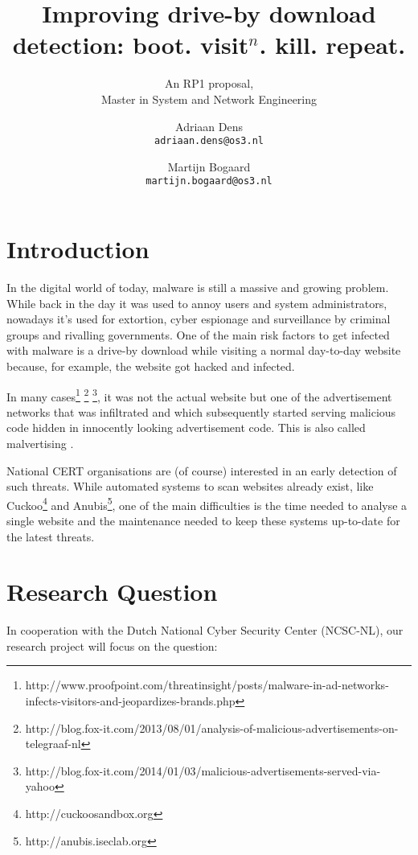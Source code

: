 \documentclass{scrartcl}
\title{Improving drive-by download detection: boot. visit$^n$. kill. repeat.}
\subtitle{An RP1 proposal,\\Master in System and Network Engineering}
\author{
  Adriaan Dens\\
   \texttt{adriaan.dens@os3.nl}
  \and
  Martijn Bogaard\\
   \texttt{martijn.bogaard@os3.nl}
}
\begin{document}
\maketitle

\section{Introduction}

In the digital world of today, malware is still a massive and growing problem. While back in the day it was used to annoy users and system administrators, nowadays it's used for extortion, cyber espionage and surveillance by criminal groups and rivalling governments. One of the main risk factors to get infected with malware is a drive-by download while visiting a normal day-to-day website because, for example, the website got hacked and infected. 

In many cases\footnote{http://www.proofpoint.com/threatinsight/posts/malware-in-ad-networks-infects-visitors-and-jeopardizes-brands.php} \footnote{http://blog.fox-it.com/2013/08/01/analysis-of-malicious-advertisements-on-telegraaf-nl} \footnote{http://blog.fox-it.com/2014/01/03/malicious-advertisements-served-via-yahoo}, it was not the actual website but one of the advertisement networks that was infiltrated and which subsequently started serving malicious code hidden in innocently looking advertisement code. This is also called malvertising \cite{Li2012}.

National CERT organisations are (of course) interested in an early detection of such threats. While automated systems to scan websites already exist, like Cuckoo\footnote{http://cuckoosandbox.org} and Anubis\footnote{http://anubis.iseclab.org}, one of the main difficulties is the time needed to analyse a single website and the maintenance needed to keep these systems up-to-date for the latest threats.

\section{Research Question}
In cooperation with the Dutch National Cyber Security Center (NCSC-NL), our research project will focus on the question:\\
\end{document}
